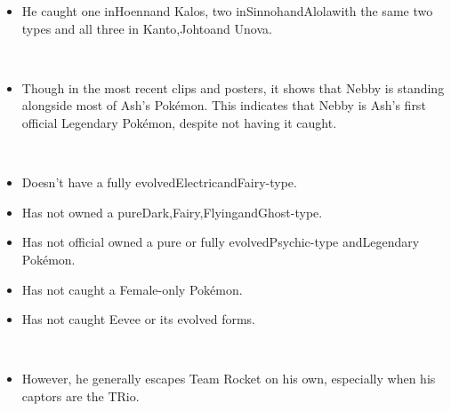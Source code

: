 \documentclass[a4paper,12pt]{article}
\begin{document}
\begin{itemize}
\item He caught one inHoennand Kalos, two inSinnohandAlolawith the same two types and all three in Kanto,Johtoand Unova.
\end{itemize}\\ \par \vspace{0.5cm}

\begin{itemize}
\item Though in the most recent clips and posters, it shows that Nebby is standing alongside most of Ash's Pokémon. This indicates that Nebby is Ash's first official Legendary Pokémon, despite not having it caught.
\end{itemize}\\ \par \vspace{0.5cm}

\begin{itemize}
\item Doesn't have a fully evolvedElectricandFairy-type.
\item Has not owned a pureDark,Fairy,FlyingandGhost-type.
\item Has not official owned a pure or fully evolvedPsychic-type andLegendary Pokémon.
\item Has not caught a Female-only Pokémon.
\item Has not caught Eevee or its evolved forms.
\end{itemize}\\ \par \vspace{0.5cm}

\begin{itemize}
\item However, he generally escapes Team Rocket on his own, especially when his captors are the TRio.
\end{itemize}\\ \par \vspace{0.5cm}
\end{document}
